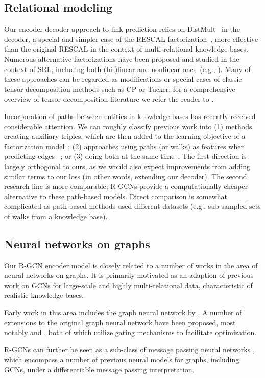 \subsection{Relational modeling}
Our encoder-decoder approach to link prediction relies on DistMult~\cite{distmult-embedding_entities_and_relations} in the decoder,  a special and simpler case of the RESCAL factorization~\cite{nickel2011three}, more effective than the original RESCAL in the context of multi-relational knowledge bases. Numerous alternative factorizations have been proposed and studied in the context of SRL, including both (bi-)linear and nonlinear ones~(e.g., \cite{bordes2013translating,socher2013reasoning,KaiWei14,nickel2015holographic,complex-complex_embeddings_for_simple_link_prediction}). Many of these approaches can be regarded as modifications or special cases of classic tensor decomposition methods such as CP or Tucker; for a comprehensive overview of tensor decomposition literature we refer the reader to \citet{kolda2009tensor}.

Incorporation of paths between entities in knowledge
bases has recently received considerable attention. We can roughly classify previous work into (1) methods creating auxiliary triples, which are then added to the learning objective of a factorization model~\cite{guu2015traversing,garcia2015composing}; (2) approaches using paths (or walks) as features when predicting edges ~\cite{lin2015modeling}; or (3) doing both at the same time~\cite{neelakantan2015compositional,toutanova2016compositional}. The first direction is largely orthogonal to ours, as we would also expect improvements from adding similar terms to our loss (in other words, extending our decoder). The second research line is more comparable; R-GCNs provide a computationally cheaper alternative to these path-based models. %
Direct comparison is somewhat complicated as path-based methods used different datasets (e.g., sub-sampled sets of walks from a knowledge base).

\subsection{Neural networks on graphs}
Our R-GCN encoder model is closely related to a number of works in the area of neural networks on graphs. It is primarily motivated as an adaption of previous work on GCNs \cite{bruna2014spectral,duvenaud2015convolutional,defferrard2016convolutional,kipf2016semi} for large-scale and highly multi-relational data, characteristic of realistic knowledge bases.

Early work in this area includes the graph neural network by \citet{scarselli2009graph}. A number of extensions to the original graph neural network have been proposed, most notably \cite{li2015gated} and \cite{pham2016column}, both of which utilize gating mechanisms to facilitate optimization.

R-GCNs can further be seen as a sub-class of message passing neural networks \cite{gilmer2017neural}, which encompass a number of previous neural models for graphs, including GCNs, under a differentiable message passing interpretation.
